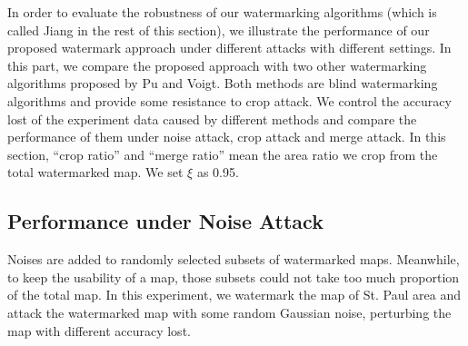 %


In order to evaluate the robustness of our watermarking algorithms (which is called
Jiang in the rest of this section), we illustrate 
the performance of our proposed watermark approach under different attacks with 
different settings. In this part, we compare the proposed approach with two other 
watermarking algorithms proposed by Pu\cite{PuDJ06} and 
Voigt\cite{Voigt:2003}. Both methods are blind watermarking algorithms and provide 
some resistance to crop attack. We control the accuracy lost of the experiment data 
caused by different methods and compare the performance of them under noise attack, 
crop attack and merge attack. In this section, ``crop ratio'' and ``merge ratio'' 
mean the area ratio we crop from the total watermarked map. We set $\xi$ as 0.95.

\subsection{Performance under Noise Attack}
Noises are added to randomly selected subsets of watermarked maps. Meanwhile, to 
keep the usability of a map, those subsets could not take too much proportion of the total 
map. In this experiment, we watermark the map of St. Paul area and attack the watermarked 
map with some random Gaussian noise, perturbing the map with different accuracy lost. 

